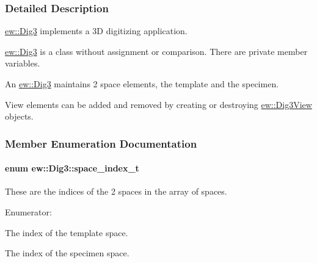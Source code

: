 \subsubsection{Detailed Description}
\hyperlink{classew_1_1Dig3}{ew::Dig3} implements a 3D digitizing application.

\hyperlink{classew_1_1Dig3}{ew::Dig3} is a class without assignment or comparison. There are private member variables.

An \hyperlink{classew_1_1Dig3}{ew::Dig3} maintains 2 space elements, the template and the specimen.

View elements can be added and removed by creating or destroying \hyperlink{classew_1_1Dig3View}{ew::Dig3View} objects. 

\subsubsection{Member Enumeration Documentation}
\hypertarget{classew_1_1Dig3_a218d7ccda5d476de1b2c8970f9c383ee}{
\paragraph[{space\_\-index\_\-t}]{\setlength{\rightskip}{0pt plus 5cm}enum {\bf ew::Dig3::space\_\-index\_\-t}}\hfill}
\label{classew_1_1Dig3_a218d7ccda5d476de1b2c8970f9c383ee}
These are the indices of the 2 spaces in the array of spaces. \begin{Desc}
\item[Enumerator: ]\par
\begin{description}
\item[{\em 
\hypertarget{classew_1_1Dig3_a218d7ccda5d476de1b2c8970f9c383eea8c1f651f962feb7eab6c19ee25118422}{
SPACE\_\-TEMPLATE}
\label{classew_1_1Dig3_a218d7ccda5d476de1b2c8970f9c383eea8c1f651f962feb7eab6c19ee25118422}
}]The index of the template space. \item[{\em 
\hypertarget{classew_1_1Dig3_a218d7ccda5d476de1b2c8970f9c383eea6efc6a44da15940b77ef70100ff927cc}{
SPACE\_\-SPECIMEN}
\label{classew_1_1Dig3_a218d7ccda5d476de1b2c8970f9c383eea6efc6a44da15940b77ef70100ff927cc}
}]The index of the specimen space. \end{description}
\end{Desc}


